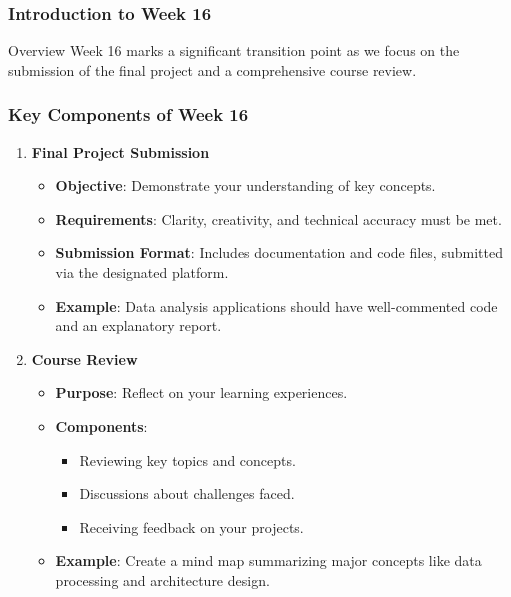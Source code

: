 \documentclass[aspectratio=169]{beamer}
\begin{document}
\frame{\titlepage}

\begin{frame}[fragile]
    \frametitle{Introduction to Week 16}
    \begin{block}{Overview}
        Week 16 marks a significant transition point as we focus on the submission of the final project and a comprehensive course review.
    \end{block}
\end{frame}

\begin{frame}[fragile]
    \frametitle{Key Components of Week 16}
    \begin{enumerate}
        \item \textbf{Final Project Submission}
            \begin{itemize}
                \item \textbf{Objective}: Demonstrate your understanding of key concepts.
                \item \textbf{Requirements}: Clarity, creativity, and technical accuracy must be met.
                \item \textbf{Submission Format}: Includes documentation and code files, submitted via the designated platform.
                \item \textbf{Example}: Data analysis applications should have well-commented code and an explanatory report.
            \end{itemize}

        \item \textbf{Course Review}
            \begin{itemize}
                \item \textbf{Purpose}: Reflect on your learning experiences.
                \item \textbf{Components}:
                    \begin{itemize}
                        \item Reviewing key topics and concepts.
                        \item Discussions about challenges faced.
                        \item Receiving feedback on your projects.
                    \end{itemize}
                \item \textbf{Example}: Create a mind map summarizing major concepts like data processing and architecture design.
            \end{itemize}
    \end{enumerate}
\end{frame}
\end{document}

